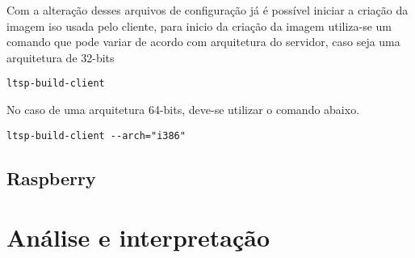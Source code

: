 \documentclass[
	12pt,				%
	openright,			%
	twoside,			%
	a4paper,			%
	chapter=TITLE,		%
	english,			%
	brazil				%
	]{abntex2}
\begin{document}
Com a alteração desses arquivos de configuração já é possível iniciar a criação da imagem iso usada pelo cliente, para inicio da criação da imagem utiliza-se um comando que pode variar de acordo com arquitetura do servidor, caso seja uma arquitetura de 32-bits

\begin{verbatim}
ltsp-build-client
\end{verbatim}

No caso de uma arquitetura 64-bits, deve-se utilizar o comando abaixo.

\begin{verbatim}
ltsp-build-client --arch="i386" 
\end{verbatim}


\chapter{Raspberry}









\part{Análise e interpretação}




\end{document}
